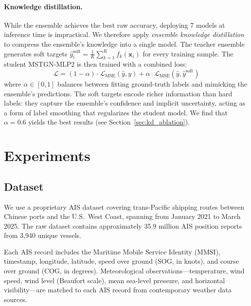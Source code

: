 \documentclass[conference]{IEEEtran}
\begin{document}
\paragraph{Knowledge distillation.}
While the ensemble achieves the best raw accuracy, deploying 7 models at inference time is impractical.
We therefore apply \textit{ensemble knowledge distillation}~\cite{hinton2015distilling} to compress the ensemble's knowledge into a single model.
The teacher ensemble generates soft targets $\hat{y}^{\text{soft}}_i = \frac{1}{K}\sum_{k=1}^{K} f_k(\mathbf{x}_i)$ for every training sample.
The student MSTGN-MLP2 is then trained with a combined loss:
\begin{equation}
    \mathcal{L} = (1-\alpha) \cdot \mathcal{L}_{\text{MSE}}(\hat{y}, y) + \alpha \cdot \mathcal{L}_{\text{MSE}}(\hat{y}, \hat{y}^{\text{soft}})
    \label{eq:kd_loss}
\end{equation}
where $\alpha \in [0, 1]$ balances between fitting ground-truth labels and mimicking the ensemble's predictions.
The soft targets encode richer information than hard labels: they capture the ensemble's confidence and implicit uncertainty, acting as a form of label smoothing that regularizes the student model.
We find that $\alpha = 0.6$ yields the best results (see Section~\ref{sec:kd_ablation}).


\section{Experiments}

\subsection{Dataset}

We use a proprietary AIS dataset covering trans-Pacific shipping routes between Chinese ports and the U.S.\ West Coast, spanning from January 2021 to March 2025.
The raw dataset contains approximately 35.9 million AIS position reports from 3,940 unique vessels.

Each AIS record includes the Maritime Mobile Service Identity (MMSI), timestamp, longitude, latitude, speed over ground (SOG, in knots), and course over ground (COG, in degrees).
Meteorological observations---temperature, wind speed, wind level (Beaufort scale), mean sea-level pressure, and horizontal visibility---are matched to each AIS record from contemporary weather data sources.
\end{document}
